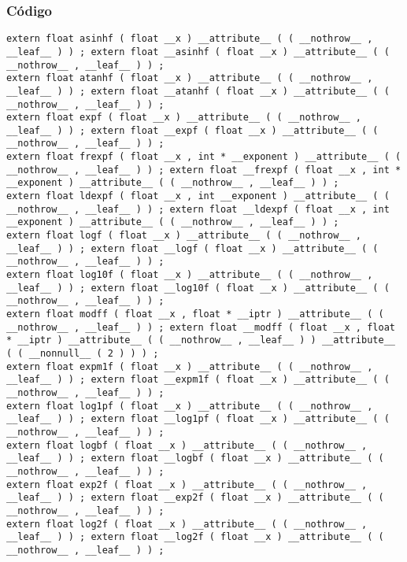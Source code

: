 \documentclass{beamer}
\begin{document}
\begin{frame}[fragile]
\frametitle{C\'odigo}
\begin{verbatim}
extern float asinhf ( float __x ) __attribute__ ( ( __nothrow__ , __leaf__ ) ) ; extern float __asinhf ( float __x ) __attribute__ ( ( __nothrow__ , __leaf__ ) ) ; 
extern float atanhf ( float __x ) __attribute__ ( ( __nothrow__ , __leaf__ ) ) ; extern float __atanhf ( float __x ) __attribute__ ( ( __nothrow__ , __leaf__ ) ) ; 
extern float expf ( float __x ) __attribute__ ( ( __nothrow__ , __leaf__ ) ) ; extern float __expf ( float __x ) __attribute__ ( ( __nothrow__ , __leaf__ ) ) ; 
extern float frexpf ( float __x , int * __exponent ) __attribute__ ( ( __nothrow__ , __leaf__ ) ) ; extern float __frexpf ( float __x , int * __exponent ) __attribute__ ( ( __nothrow__ , __leaf__ ) ) ; 
extern float ldexpf ( float __x , int __exponent ) __attribute__ ( ( __nothrow__ , __leaf__ ) ) ; extern float __ldexpf ( float __x , int __exponent ) __attribute__ ( ( __nothrow__ , __leaf__ ) ) ; 
extern float logf ( float __x ) __attribute__ ( ( __nothrow__ , __leaf__ ) ) ; extern float __logf ( float __x ) __attribute__ ( ( __nothrow__ , __leaf__ ) ) ; 
extern float log10f ( float __x ) __attribute__ ( ( __nothrow__ , __leaf__ ) ) ; extern float __log10f ( float __x ) __attribute__ ( ( __nothrow__ , __leaf__ ) ) ; 
extern float modff ( float __x , float * __iptr ) __attribute__ ( ( __nothrow__ , __leaf__ ) ) ; extern float __modff ( float __x , float * __iptr ) __attribute__ ( ( __nothrow__ , __leaf__ ) ) __attribute__ ( ( __nonnull__ ( 2 ) ) ) ; 
extern float expm1f ( float __x ) __attribute__ ( ( __nothrow__ , __leaf__ ) ) ; extern float __expm1f ( float __x ) __attribute__ ( ( __nothrow__ , __leaf__ ) ) ; 
extern float log1pf ( float __x ) __attribute__ ( ( __nothrow__ , __leaf__ ) ) ; extern float __log1pf ( float __x ) __attribute__ ( ( __nothrow__ , __leaf__ ) ) ; 
extern float logbf ( float __x ) __attribute__ ( ( __nothrow__ , __leaf__ ) ) ; extern float __logbf ( float __x ) __attribute__ ( ( __nothrow__ , __leaf__ ) ) ; 
extern float exp2f ( float __x ) __attribute__ ( ( __nothrow__ , __leaf__ ) ) ; extern float __exp2f ( float __x ) __attribute__ ( ( __nothrow__ , __leaf__ ) ) ; 
extern float log2f ( float __x ) __attribute__ ( ( __nothrow__ , __leaf__ ) ) ; extern float __log2f ( float __x ) __attribute__ ( ( __nothrow__ , __leaf__ ) ) ; 
\end{verbatim}
\end{frame}
\end{document}
